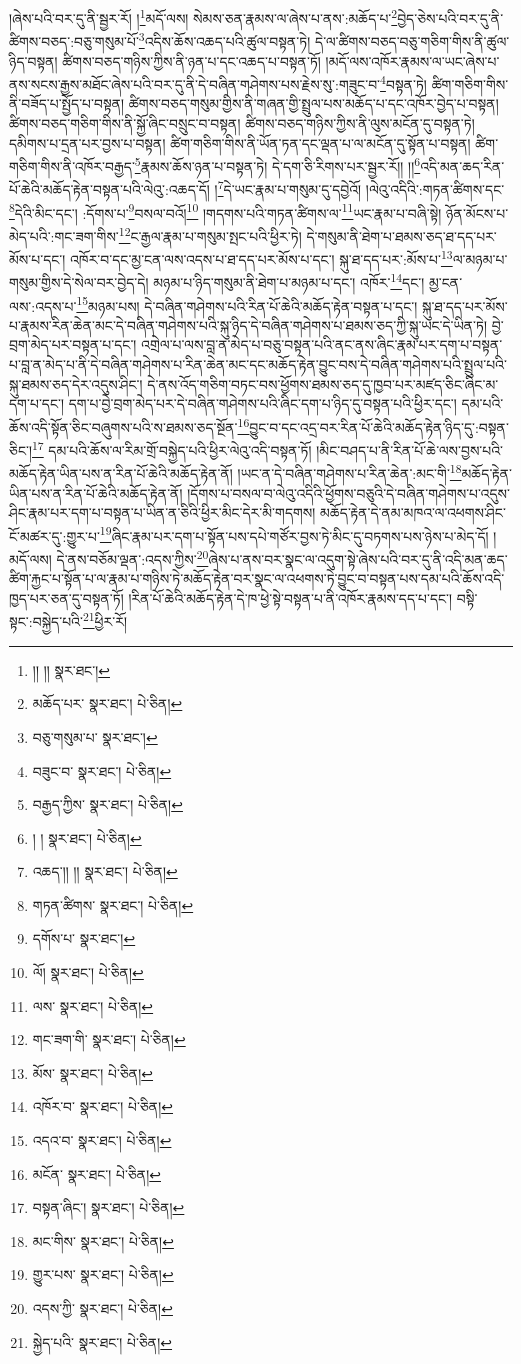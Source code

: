 །ཞེས་པའི་བར་དུ་ནི་སྦྱར་རོ། །\footnote{།། །།  སྣར་ཐང་། }མདོ་ལས། སེམས་ཅན་རྣམས་ལ་ཞེས་པ་ནས་:མཆོད་པ་\footnote{མཆོད་པར་  སྣར་ཐང་།  པེ་ཅིན། }བྱེད་ཅེས་པའི་བར་དུ་ནི་ཚིགས་བཅད་:བཅུ་གསུམ་པོ་\footnote{བཅུ་གསུམ་པ་  སྣར་ཐང་། }འདིས་ཆོས་འཆད་པའི་ཚུལ་བསྟན་ཏེ། དེ་ལ་ཚིགས་བཅད་བཅུ་གཅིག་གིས་ནི་ཚུལ་ཉིད་བསྟན། ཚིགས་བཅད་གཉིས་ཀྱིས་ནི་ཉན་པ་དང་འཆད་པ་བསྟན་ཏོ། །མདོ་ལས་འཁོར་རྣམས་ལ་ཡང་ཞེས་པ་ནས་སངས་རྒྱས་མཐོང་ཞེས་པའི་བར་དུ་ནི་དེ་བཞིན་གཤེགས་པས་རྗེས་སུ་:གཟུང་བ་\footnote{བཟུང་བ་  སྣར་ཐང་།  པེ་ཅིན། }བསྟན་ཏེ། ཚིག་གཅིག་གིས་ནི་བཟོད་པ་སྤྱོད་པ་བསྟན། ཚིགས་བཅད་གསུམ་གྱིས་ནི་གཞན་གྱི་སྤྲུལ་པས་མཆོད་པ་དང་འཁོར་བྱེད་པ་བསྟན། ཚིགས་བཅད་གཅིག་གིས་ནི་སྐྱོ་ཞིང་བསྲུང་བ་བསྟན། ཚིགས་བཅད་གཉིས་ཀྱིས་ནི་ལུས་མངོན་དུ་བསྟན་ཏེ། དམིགས་པ་དྲན་པར་བྱས་པ་བསྟན། ཚིག་གཅིག་གིས་ནི་ཡོན་ཏན་དང་ལྡན་པ་ལ་མངོན་དུ་སྟོན་པ་བསྟན། ཚིག་གཅིག་གིས་ནི་འཁོར་བརྒྱད་\footnote{བརྒྱད་ཀྱིས་  སྣར་ཐང་།  པེ་ཅིན། }རྣམས་ཆོས་ཉན་པ་བསྟན་ཏེ། དེ་དག་ཅི་རིགས་པར་སྦྱར་རོ།། །།\footnote{། །  སྣར་ཐང་།  པེ་ཅིན། }འདི་མན་ཆད་རིན་པོ་ཆེའི་མཆོད་རྟེན་བསྟན་པའི་ལེའུ་:འཆད་དོ། །\footnote{འཆད་།། །།  སྣར་ཐང་།  པེ་ཅིན། }དེ་ཡང་རྣམ་པ་གསུམ་དུ་དབྱེའོ། །ལེའུ་འདིའི་:གཏན་ཚིགས་དང་\footnote{གཏན་ཚིགས་  སྣར་ཐང་།  པེ་ཅིན། }དེའི་མིང་དང་། :དོགས་པ་\footnote{དགོས་པ་  སྣར་ཐང་། }བསལ་བའོ།\footnote{ལོ།  སྣར་ཐང་།  པེ་ཅིན། } །གདགས་པའི་གཏན་ཚིགས་ལ་\footnote{ལས་  སྣར་ཐང་།  པེ་ཅིན། }ཡང་རྣམ་པ་བཞི་སྟེ། ཉོན་མོངས་པ་མེད་པའི་:གང་ཟག་གིས་\footnote{གང་ཟག་གི་  སྣར་ཐང་།  པེ་ཅིན། }ང་རྒྱལ་རྣམ་པ་གསུམ་སྤང་པའི་ཕྱིར་ཏེ། དེ་གསུམ་ནི་ཐེག་པ་ཐམས་ཅད་ཐ་དད་པར་མོས་པ་དང་། འཁོར་བ་དང་མྱ་ངན་ལས་འདས་པ་ཐ་དད་པར་མོས་པ་དང་། སྐུ་ཐ་དད་པར་:མོས་པ་\footnote{མོས་  སྣར་ཐང་།  པེ་ཅིན། }ལ་མཉམ་པ་གསུམ་གྱིས་དེ་སེལ་བར་བྱེད་དེ། མཉམ་པ་ཉིད་གསུམ་ནི་ཐེག་པ་མཉམ་པ་དང་། འཁོར་\footnote{འཁོར་བ་  སྣར་ཐང་།  པེ་ཅིན། }དང་། མྱ་ངན་ལས་:འདས་པ་\footnote{འདའ་བ་  སྣར་ཐང་།  པེ་ཅིན། }མཉམ་པས། དེ་བཞིན་གཤེགས་པའི་རིན་པོ་ཆེའི་མཆོད་རྟེན་བསྟན་པ་དང་། སྐུ་ཐ་དད་པར་མོས་པ་རྣམས་རིན་ཆེན་མང་དེ་བཞིན་གཤེགས་པའི་སྐུ་ཉིད་དེ་བཞིན་གཤེགས་པ་ཐམས་ཅད་ཀྱི་སྐུ་ཡང་དེ་ཡིན་ཏེ། བྱེ་བྲག་མེད་པར་བསྟན་པ་དང་། འགྲེལ་པ་ལས་བླ་ན་མེད་པ་བཅུ་བསྟན་པའི་ནང་ནས་ཞིང་རྣམ་པར་དག་པ་བསྟན་པ་བླ་ན་མེད་པ་ནི་དེ་བཞིན་གཤེགས་པ་རིན་ཆེན་མང་དང་མཆོད་རྟེན་བྱུང་བས་དེ་བཞིན་གཤེགས་པའི་སྤྲུལ་པའི་སྐུ་ཐམས་ཅད་དེར་འདུས་ཤིང་། དེ་ནས་འོད་གཅིག་བཏང་བས་ཕྱོགས་ཐམས་ཅད་དུ་ཁྱབ་པར་མཛད་ཅིང་ཞིང་མ་དག་པ་དང་། དག་པ་བྱེ་བྲག་མེད་པར་དེ་བཞིན་གཤེགས་པའི་ཞིང་དག་པ་ཉིད་དུ་བསྟན་པའི་ཕྱིར་དང་། དམ་པའི་ཆོས་འདི་སྟོན་ཅིང་བཞུགས་པའི་ས་ཐམས་ཅད་སྔོན་\footnote{མངོན་  སྣར་ཐང་།  པེ་ཅིན། }བྱུང་བ་དང་འདྲ་བར་རིན་པོ་ཆེའི་མཆོད་རྟེན་ཉིད་དུ་:བསྟན་ཅིང་།\footnote{བསྟན་ཞིང་།  སྣར་ཐང་།  པེ་ཅིན། } དམ་པའི་ཆོས་ལ་རིམ་གྲོ་བསྐྱེད་པའི་ཕྱིར་ལེའུ་འདི་བསྟན་ཏོ། །མིང་བཤད་པ་ནི་རིན་པོ་ཆེ་ལས་བྱས་པའི་མཆོད་རྟེན་ཡིན་པས་ན་རིན་པོ་ཆེའི་མཆོད་རྟེན་ནོ། །ཡང་ན་དེ་བཞིན་གཤེགས་པ་རིན་ཆེན་:མང་གི་\footnote{མང་གིས་  སྣར་ཐང་།  པེ་ཅིན། }མཆོད་རྟེན་ཡིན་པས་ན་རིན་པོ་ཆེའི་མཆོད་རྟེན་ནོ། །དོགས་པ་བསལ་བ་ལེའུ་འདིའི་ཕྱོགས་བཅུའི་དེ་བཞིན་གཤེགས་པ་འདུས་ཤིང་རྣམ་པར་དག་པ་བསྟན་པ་ཡིན་ན་ཅིའི་ཕྱིར་མིང་དེར་མི་གདགས། མཆོད་རྟེན་དེ་ནམ་མཁའ་ལ་འཕགས་ཤིང་ངོ་མཚར་དུ་:གྱུར་པ་\footnote{གྱུར་པས་  སྣར་ཐང་།  པེ་ཅིན། }ཞིང་རྣམ་པར་དག་པ་སྟོན་པས་དཔེ་གཙོར་བྱས་ཏེ་མིང་དུ་བཏགས་པས་ཉེས་པ་མེད་དོ། །མདོ་ལས། དེ་ནས་བཅོམ་ལྡན་:འདས་ཀྱིས་\footnote{འདས་ཀྱི་  སྣར་ཐང་།  པེ་ཅིན། }ཞེས་པ་ནས་བར་སྣང་ལ་འདུག་སྟེ་ཞེས་པའི་བར་དུ་ནི་འདི་མན་ཆད་ཚིག་རྐྱང་པ་སྟོན་པ་ལ་རྣམ་པ་གཉིས་ཏེ་མཆོད་རྟེན་བར་སྣང་ལ་འཕགས་ཏེ་བྱུང་བ་བསྟན་པས་དམ་པའི་ཆོས་འདི་ཁྱད་པར་ཅན་དུ་བསྟན་ཏོ། །རིན་པོ་ཆེའི་མཆོད་རྟེན་དེ་ཁ་ཕྱེ་སྟེ་བསྟན་པ་ནི་འཁོར་རྣམས་དད་པ་དང་། བསྟི་སྟང་:བསྐྱེད་པའི་\footnote{སྐྱེད་པའི་  སྣར་ཐང་།  པེ་ཅིན། }ཕྱིར་རོ། 